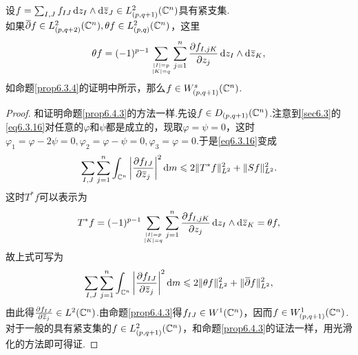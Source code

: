 \begin{prop}\label{prop6.4.4}
	设$f=\sum_{I,J}f_{IJ}\mathop{}\!\mathrm dz_I\wedge\mathop{}\!\mathrm d{}\mkern1mu\overline{\mkern-1muz}_J\in L_{(p,q+1)}^2(\mathbb C^n)$具有紧支集.\\
	如果${}\mkern1mu\overline{\mkern-1mu\partial}f\in L_{(p,q+2)}^2(\mathbb C^n),\theta f\in L_{(p,q)}^2(\mathbb C^n)$，这里
	\[\theta f=(-1)^{p-1}\sum_{|I|=p\atop|K|=q}\sum_{j=1}^{n}\frac{\partial f_{I,jK}}{\partial z_j}\mathop{}\!\mathrm dz_I\wedge\mathop{}\!\mathrm d{}\mkern1mu\overline{\mkern-1muz}_K,\]
	如命题\ref{prop6.3.4}的证明中所示，那么$f\in W_{(p,q+1)}^s(\mathbb C^n)$.
\end{prop}
\begin{proof}
	和证明命题\ref{prop6.4.3}的方法一样.先设$f\in D_{(p,q+1)}(\mathbb C^n)$.注意到\ref{sec6.3}的\eqref{eq6.3.16}对任意的$\varphi$和$\psi$都是成立的，现取$\varphi=\psi=0$，这时$\varphi_1=\varphi-2\psi=0,\varphi_2=\varphi-\psi=0,\varphi_3=\varphi=0$.于是\eqref{eq6.3.16}变成
	\[\sum_{I,J}\sum_{j=1}^{n}\int_{\mathbb C^n}\left|\frac{\partial f_{IJ}}{\partial {}\mkern1mu\overline{\mkern-1muz}_j}\right|^2\mathop{}\!\mathrm{d} m\leqslant2\Vert T^\ast f\Vert_{L^2}^2+\Vert Sf\Vert_{L^2}^2.\]
	这时$T^\ast f$可以表示为
	\[T^\ast f=(-1)^{p-1}\sum_{|I|=p\atop|K|=q}\sum_{j=1}^{n}\frac{\partial f_{I,jK}}{\partial z_j}\mathop{}\!\mathrm dz_I\wedge\mathop{}\!\mathrm d{}\mkern1mu\overline{\mkern-1muz}_K=\theta f,\]
	故上式可写为
	\[\sum_{I,J}\sum_{j=1}^{n}\int_{\mathbb C^n}\left|\frac{\partial f_{IJ}}{\partial {}\mkern1mu\overline{\mkern-1muz}_j}\right|^2\mathop{}\!\mathrm{d} m\leqslant2\Vert \theta f\Vert_{L^2}^2+\Vert {}\mkern1mu\overline{\mkern-1mu\partial}f\Vert_{L^2}^2,\]
	由此得$\frac{\partial f_{IJ}}{\partial {}\mkern1mu\overline{\mkern-1muz}_j}\in L^2(\mathbb C^n)$.由命题\ref{prop6.4.3}得$f_{IJ}\in W^1(\mathbb C^n)$，因而$f\in W_{(p,q+1)}^1(\mathbb C^n)$.对于一般的具有紧支集的$f\in L_{(p,q+1)}^2(\mathbb C^n)$，和命题\ref{prop6.4.3}的证法一样，用光滑化的方法即可得证.
\end{proof}
